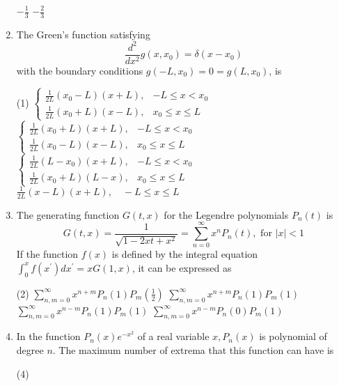 \begin{enumerate}[label=\color{ocre}\textbf{\arabic*.}]
\begin{tasks}
		\task[\textbf{C.}]  $-\frac{1}{3}$
		\task[\textbf{D.}] $-\frac{2}{3}$
	\end{tasks}
	\item  The Green's function satisfying
	$$
	\frac{d^{2}}{d x^{2}} g\left(x, x_{0}\right)=\delta\left(x-x_{0}\right)
	$$
	with the boundary conditions $g\left(-L, x_{0}\right)=0=g\left(L, x_{0}\right)$, is
	{}
	\begin{tasks}(1)
		\task[\textbf{A.}] $\left\{\begin{array}{ll}\frac{1}{2 L}\left(x_{0}-L\right)(x+L), & -L \leq x<x_{0} \\ \frac{1}{2 L}\left(x_{0}+L\right)(x-L), & x_{0} \leq x \leq L\end{array}\right.$
		\task[\textbf{B.}]  $\left\{\begin{array}{ll}\frac{1}{2 L}\left(x_{0}+L\right)(x+L), & -L \leq x<x_{0} \\ \frac{1}{2 L}\left(x_{0}-L\right)(x-L), & x_{0} \leq x \leq L\end{array}\right.$
		\task[\textbf{C.}] $\left\{\begin{array}{ll}\frac{1}{2 L}\left(L-x_{0}\right)(x+L), & -L \leq x<x_{0} \\ \frac{1}{2 L}\left(x_{0}+L\right)(L-x), & x_{0} \leq x \leq L\end{array}\right.$
		\task[\textbf{D.}] $\frac{1}{2 L}(x-L)(x+L), \quad-L \leq x \leq L$
	\end{tasks}
	\item  The generating function $G(t, x)$ for the Legendre polynomials $P_{n}(t)$ is
	$$
	G(t, x)=\frac{1}{\sqrt{1-2 x t+x^{2}}}=\sum_{n=0}^{\infty} x^{n} P_{n}(t), \text { for }|x|<1
	$$
	If the function $f(x)$ is defined by the integral equation $\int_{0}^{x} f\left(x^{\prime}\right) d x^{\prime}=x G(1, x)$, it can be expressed as
	{}
	\begin{tasks}(2)
		\task[\textbf{A.}] $\sum_{n, m=0}^{\infty} x^{n+m} P_{n}(1) P_{m}\left(\frac{1}{2}\right)$
		\task[\textbf{B.}] $\sum_{n, m=0}^{\infty} x^{n+m} P_{n}(1) P_{m}(1)$
		\task[\textbf{C.}] $\sum_{n, m=0}^{\infty} x^{n-m} P_{n}(1) P_{m}(1)$
		\task[\textbf{D.}] $\sum_{n, m=0}^{\infty} x^{n-m} P_{n}(0) P_{m}(1)$
	\end{tasks}
	\item In the function $P_{n}(x) e^{-x^{2}}$ of a real variable $x, P_{n}(x)$ is polynomial of degree $n$. The maximum number of extrema that this function can have is
	{}
	\begin{tasks}(4)

\end{tasks}
\end{enumerate}
